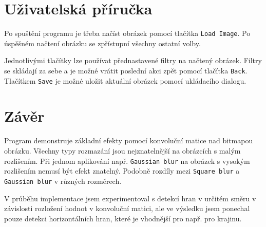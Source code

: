 \documentclass[12pt]{article}
\begin{document}
\section{Uživatelská příručka}
Po spuštění programu je třeba načíst obrázek pomocí tlačítka \texttt{Load Image}. Po úspěšném načtení obrázku se zpřístupní všechny ostatní volby. 

Jednotlivými tlačítky lze používat přednastavené filtry na načtený obrázek. Filtry se skládají za sebe a je možné vrátit poslední akci zpět pomocí tlačítka \texttt{Back}. Tlačítkem \texttt{Save} je možné uložit aktuální obrázek pomocí ukládacího dialogu.

\section{Závěr}
Program demonstruje základní efekty pomocí konvoluční matice nad bitmapou obrázku. Všechny typy rozmazání jsou nejznatelnější na obrázcích s malým rozlišením. Při jednom aplikování např. \texttt{Gaussian blur} na obrázek s vysokým rozlišením nemusí být efekt znatelný. Podobně rozdíly mezi \texttt{Square blur} a \texttt{Gaussian blur} v různých rozměrech. 

V průběhu implementace jsem experimentoval s detekcí hran v určitém směru v závislosti rozložení hodnot v konvoluční matici, ale ve výsledku jsem ponechal pouze detekci horizontálních hran, které je vhodnější pro např. pro krajinu.
\end{document}
